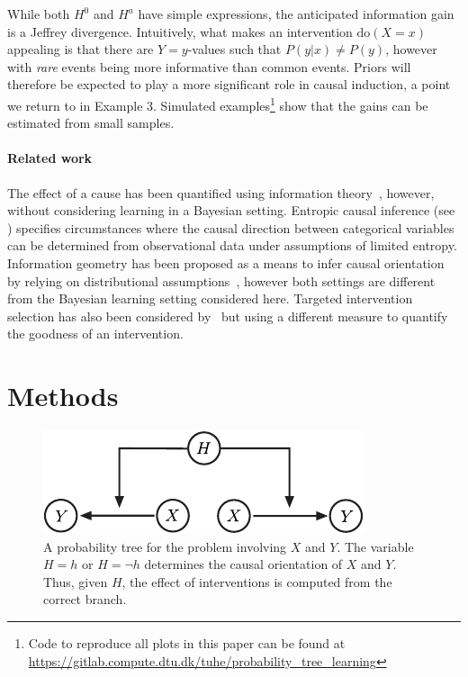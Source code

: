\documentclass[letterpaper]{article} %
\newcommand{\doo}{\textrm{do}}
\begin{document}
While both $H^0$ and $H^a$ have simple expressions, the anticipated information gain is a Jeffrey divergence.
Intuitively, what makes an intervention $\doo(X=x)$ appealing is that there are $Y=y$-values such that $P(y|x) \neq P(y)$, however with \emph{rare} events being more informative than common events.
Priors will therefore be expected to play a more significant role in causal induction, a point we return to in Example 3.
Simulated examples\footnote{Code to reproduce all plots in this paper can be found at \url{https://gitlab.compute.dtu.dk/tuhe/probability_tree_learning}} show that  the gains can be estimated from small samples.


\paragraph{Related work}
The effect of a cause has been quantified using information theory~\cite{wieczorek2019information}, however, without considering learning in a Bayesian setting. Entropic causal inference (see \cite{compton2021entropic}) specifies circumstances where the causal direction between categorical variables can be determined from observational data under assumptions of limited entropy. Information geometry has been proposed as a means to infer causal orientation by relying on distributional assumptions~\cite{janzing2012information}, however both settings are different from the Bayesian learning setting considered here. Targeted intervention selection has also been considered by~\cite{agrawal2019abcd,tong2001active} but using a different measure to quantify the goodness of an intervention.
















\section{Methods}

\begin{figure}[t!]
\centering
\includegraphics[width=.85\linewidth]{fig2svg-crop}
\caption{A probability tree for the problem involving $X$ and $Y$. The variable $H = h$ or $H = \neg h$ determines the causal orientation of $X$ and $Y$. Thus, given $H$, the effect of interventions is computed from the correct branch. }\label{fig2svg}
\end{figure}
\end{document}
